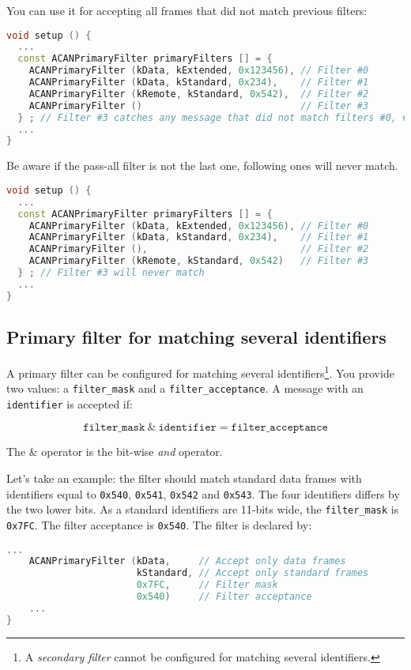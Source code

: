 \documentclass[10pt, a4paper, obeyspaces, openany]{extarticle}
\newcommand \subsectionLabel[2]{\subsection{#1}\label{subsec:#2}}
\begin{document}
You can use it for accepting all frames that did not match previous filters:
{ \small\begin{lstlisting}[language=c++]
void setup () {
  ...
  const ACANPrimaryFilter primaryFilters [] = {
    ACANPrimaryFilter (kData, kExtended, 0x123456), // Filter #0
    ACANPrimaryFilter (kData, kStandard, 0x234),    // Filter #1
    ACANPrimaryFilter (kRemote, kStandard, 0x542),  // Filter #2
    ACANPrimaryFilter ()                            // Filter #3
  } ; // Filter #3 catches any message that did not match filters #0, #1 and #2
  ...
}
\end{lstlisting}}

Be aware if the pass-all filter is not the last one, following ones will never match.
{ \small\begin{lstlisting}[language=c++]
void setup () {
  ...
  const ACANPrimaryFilter primaryFilters [] = {
    ACANPrimaryFilter (kData, kExtended, 0x123456), // Filter #0
    ACANPrimaryFilter (kData, kStandard, 0x234),    // Filter #1
    ACANPrimaryFilter (),                           // Filter #2
    ACANPrimaryFilter (kRemote, kStandard, 0x542)   // Filter #3
  } ; // Filter #3 will never match
  ...
}
\end{lstlisting}}



\subsectionLabel{Primary filter for matching several identifiers}{primaryMultipleFilter}

A primary filter can be configured for matching several identifiers\footnote{A \emph{secondary filter} cannot be configured for matching several identifiers.}. You provide two values: a \texttt{filter\_mask} and a \texttt{filter\_acceptance}. A message with an \texttt{identifier} is accepted if:

\begin{equation*}
  \texttt{filter\_mask}~\&~\texttt{identifier} = \texttt{filter\_acceptance}
\end{equation*}

The $\&$ operator is the bit-wise \emph{and} operator.

Let's take an example: the filter should match standard data frames with identifiers equal to \texttt{0x540}, \texttt{0x541}, \texttt{0x542} and \texttt{0x543}. The four identifiers differs by the two lower bits. As a standard identifiers are 11-bits wide, the \texttt{filter\_mask} is \texttt{0x7FC}. The filter acceptance is \texttt{0x540}. The filter is declared by:

{ \small\begin{lstlisting}[language=c++]
    ...
    ACANPrimaryFilter (kData,     // Accept only data frames
                       kStandard, // Accept only standard frames
                       0x7FC,     // Filter mask
                       0x540)     // Filter acceptance
    ...
}
\end{lstlisting}}
\end{document}
